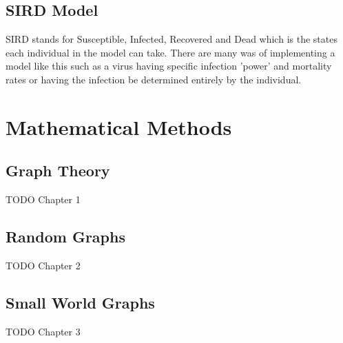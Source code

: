\documentclass{article}
\begin{document}
        \subsection{SIRD Model}
        SIRD stands for Susceptible, Infected, Recovered and Dead which is the states each individual in the model can take. There are many was of implementing a model like this such as a virus having specific infection 'power' and mortality rates or having the infection be determined entirely by the individual.
    \section{Mathematical Methods}
        \subsection{Graph Theory}
        TODO Chapter 1
        \subsection{Random Graphs}
        TODO Chapter 2
        \subsection{Small World Graphs}
        TODO Chapter 3
\end{document}
